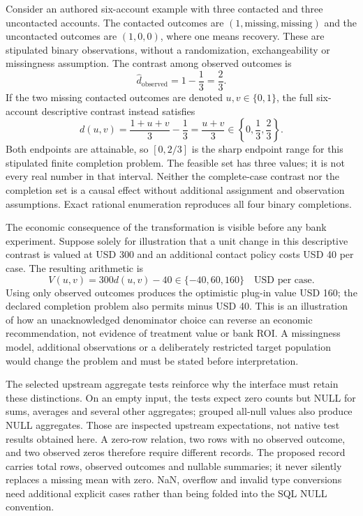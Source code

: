 Consider an authored six-account example with three contacted and three
uncontacted accounts. The contacted outcomes are $(1,\mathrm{missing},
\mathrm{missing})$ and the uncontacted outcomes are $(1,0,0)$, where one means
recovery. These are stipulated binary observations, without a randomization,
exchangeability or missingness assumption. The contrast among observed
outcomes is
\begin{equation}
 \widehat d_{\mathrm{observed}}=1-\frac13=\frac23.
 \label{exec19:duckdb-observed}
\end{equation}
If the two missing contacted outcomes are denoted $u,v\in\{0,1\}$, the
full six-account descriptive contrast instead satisfies
\begin{equation}
 d(u,v)=\frac{1+u+v}{3}-\frac13
       =\frac{u+v}{3}\in\left\{0,\frac13,\frac23\right\}.
 \label{exec19:duckdb-completions}
\end{equation}
Both endpoints are attainable, so $[0,2/3]$ is the sharp endpoint range for
this stipulated finite completion problem. The feasible set has three values;
it is not every real number in that interval. Neither the complete-case
contrast nor the completion set is a causal effect without additional
assignment and observation assumptions. Exact rational enumeration reproduces
all four binary completions.~\citep{exec19_duckdb_reference}

The economic consequence of the transformation is visible before any bank
experiment. Suppose solely for illustration that a unit change in this
descriptive contrast is valued at USD 300 and an additional contact policy
costs USD 40 per case. The resulting arithmetic is
\begin{equation}
 V(u,v)=300d(u,v)-40\in\{-40,60,160\}\quad\text{USD per case}.
 \label{exec19:duckdb-value}
\end{equation}
Using only observed outcomes produces the optimistic plug-in value USD 160;
the declared completion problem also permits minus USD 40. This is an
illustration of how an unacknowledged denominator choice can reverse an
economic recommendation, not evidence of treatment value or bank ROI. A
missingness model, additional observations or a deliberately restricted target
population would change the problem and must be stated before interpretation.
\citep{exec19_duckdb_reference}

The selected upstream aggregate tests reinforce why the interface must retain
these distinctions. On an empty input, the tests expect zero counts but NULL
for sums, averages and several other aggregates; grouped all-null values also
produce NULL aggregates. Those are inspected upstream expectations, not native
test results obtained here. A zero-row relation, two rows with no observed
outcome, and two observed zeros therefore require different records. The
proposed record carries total rows, observed outcomes and nullable summaries;
it never silently replaces a missing mean with zero. NaN, overflow and invalid
type conversions need additional explicit cases rather than being folded into
the SQL NULL convention.~\citep{exec19_duckdb_source,exec19_duckdb_reference}

